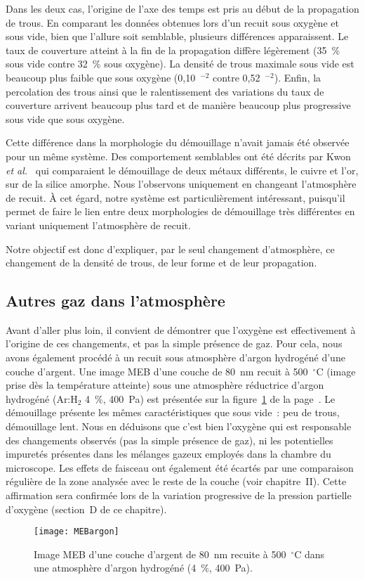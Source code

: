 Dans les deux cas, l'origine de l'axe des temps est pris au début de la propagation de trous. En comparant les données obtenues lors d'un recuit sous oxygène et sous vide, bien que l'allure soit semblable, plusieurs différences apparaissent. Le taux de couverture atteint à la fin de la propagation diffère légèrement (35~\% sous vide contre 32~\% sous oxygène). La densité de trous maximale sous vide est beaucoup plus faible que sous oxygène (0,10~\micro\meter$^{-2}$ contre 0,52~\micro\meter$^{-2}$). Enfin, la percolation des trous ainsi que le ralentissement des variations du taux de couverture arrivent beaucoup plus tard et de manière beaucoup plus progressive sous vide que sous oxygène.\par 
Cette différence dans la morphologie du démouillage n'avait jamais été observée pour un même système. Des comportement semblables ont été décrits par Kwon \textit{et al.}~\cite{kwon2003comparison} qui comparaient le démouillage de deux métaux différents, le cuivre et l'or, sur de la silice amorphe. Nous l'observons uniquement en changeant l'atmosphère de recuit. À cet égard, notre système est particulièrement intéressant, puisqu'il permet de faire le lien entre deux morphologies de démouillage très différentes en variant uniquement l'atmosphère de recuit.\par 
Notre objectif est donc d'expliquer, par le seul changement d'atmosphère, ce changement de la densité de trous, de leur forme et de leur propagation.\par 

\subsection{Autres gaz dans l'atmosphère}
Avant d'aller plus loin, il convient de démontrer que l'oxygène est effectivement à l'origine de ces changements, et pas la simple présence de gaz. Pour cela, nous avons également procédé à un recuit sous atmosphère d'argon hydrogéné d'une couche d'argent. Une image MEB d'une couche de 80~nm recuit à 500~$^\circ$C (image prise dès la température atteinte) sous une atmosphère réductrice d'argon hydrogéné (Ar:H$_2$ 4~\%, 400~Pa) est présentée sur la figure~\ref{MEBargon} de la page~\pageref{MEBargon}. Le démouillage présente les mêmes caractéristiques que sous vide~: peu de trous, démouillage lent. Nous en déduisons que c'est bien l'oxygène qui est responsable des changements observés (pas la simple présence de gaz), ni les potentielles impuretés présentes dans les mélanges gazeux employés dans la chambre du microscope. Les effets de faisceau ont également été écartés par une comparaison régulière de la zone analysée avec le reste de la couche (voir chapitre~II). Cette affirmation sera confirmée lors de la variation progressive de la pression partielle d'oxygène (section~D de ce chapitre).\par 
\begin{figure}[!p]
\centering
\texttt{[image: MEBargon]}
\caption{Image MEB d'une couche d'argent de 80~nm recuite à 500~$^\circ$C dans une atmosphère d'argon hydrogéné (4~\%, 400~Pa).}
\label{MEBargon}
\end{figure}

